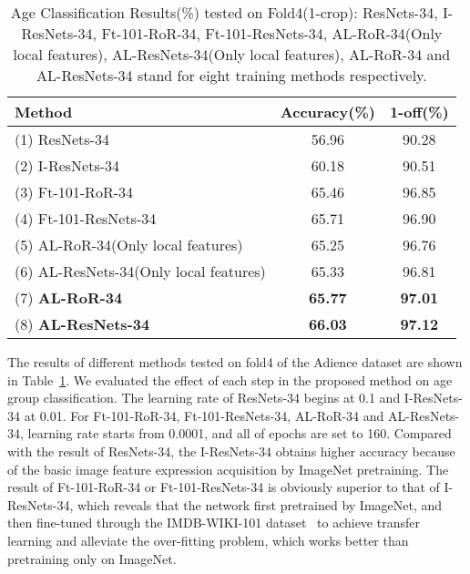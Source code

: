 \documentclass[journal]{IEEEtran}
\begin{document}
\begin{table}[hbp]
\renewcommand{\arraystretch}{1.3}
\caption{Age Classification Results(\%) tested on Fold4(1-crop): ResNets-34, I-ResNets-34, Ft-101-RoR-34, Ft-101-ResNets-34, AL-RoR-34(Only local features), AL-ResNets-34(Only local features), AL-RoR-34 and AL-ResNets-34 stand for eight training methods respectively.}
\label{tab:one Fold}
\centering
\begin{tabular}{|l|c|c|}
\hline
Method                        &Accuracy(\%)    &1-off(\%)   \\ \hline\hline
(1) ResNets-34                   &56.96           &90.28        \\\hline
(2) I-ResNets-34                   &60.18           &90.51         \\\hline
(3) Ft-101-RoR-34                  &65.46           &96.85          \\\hline
(4) Ft-101-ResNets-34              &65.71           &96.90          \\\hline
(5) AL-RoR-34(Only local features)                  &65.25           &96.76          \\\hline
(6) AL-ResNets-34(Only local features)              &65.33           &96.81          \\\hline
(7) \textbf{AL-RoR-34}               &\textbf{65.77}           &\textbf{97.01}           \\\hline
(8) \textbf{AL-ResNets-34}           &\textbf{66.03}           &\textbf{97.12}           \\\hline
\end{tabular}
\end{table}
\par
The results of different methods tested on fold4 of the Adience dataset are shown in Table~\ref{tab:one Fold}. We evaluated the effect of each step in the proposed method on age group classification. The learning rate of ResNets-34 begins at 0.1 and I-ResNets-34 at 0.01. For Ft-101-RoR-34, Ft-101-ResNets-34, AL-RoR-34 and AL-ResNets-34, learning rate starts from 0.0001, and all of epochs are set to 160. Compared with the result of ResNets-34, the I-ResNets-34 obtains higher accuracy because of the basic image feature expression acquisition by ImageNet pretraining. The result of Ft-101-RoR-34 or Ft-101-ResNets-34 is obviously superior to that of I-ResNets-34, which reveals that the network first pretrained by ImageNet, and then fine-tuned through the IMDB-WIKI-101 dataset~\cite{ref-22} to achieve transfer learning and alleviate the over-fitting problem, which works better than pretraining only on ImageNet.
\end{document}
